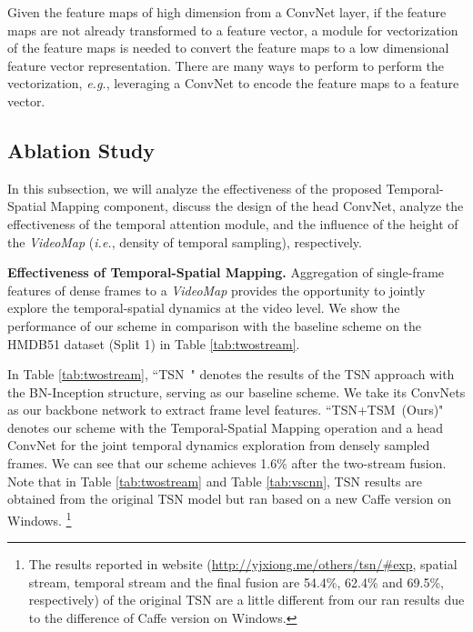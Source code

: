 \documentclass[english, 10pt, twocolumn, twoside]{IEEEtran}
\begin{document}
Given the feature maps of high dimension from a ConvNet layer, if the feature maps are not already transformed to a feature vector, a module for vectorization of the feature maps is needed to convert the feature maps to a low dimensional feature vector representation. There are many ways to perform to perform the vectorization, \emph{e.g.}, leveraging a ConvNet to encode the feature maps to a feature vector.









\subsection{Ablation Study}

In this subsection, we will analyze the effectiveness of the proposed Temporal-Spatial Mapping component, discuss the design of the head ConvNet, analyze the effectiveness of the temporal attention module, and the influence of the height of the \emph{VideoMap} (\emph{i.e.}, density of temporal sampling), respectively.


\noindent\textbf{Effectiveness of Temporal-Spatial Mapping.} Aggregation of single-frame features of dense frames to a \emph{VideoMap} provides the opportunity to jointly explore the temporal-spatial dynamics at the video level. We show the performance of our scheme in comparison with the baseline scheme on the HMDB51 dataset (Split 1) in Table \ref{tab:twostream}.

In Table \ref{tab:twostream}, ``TSN~\cite{wang2016temporal}" denotes the results of the TSN approach \cite{wang2016temporal} with the BN-Inception structure, serving as our baseline scheme. We take its ConvNets as our backbone network to extract frame level features. ``TSN+TSM~(Ours)" denotes our scheme with the Temporal-Spatial Mapping operation and a head ConvNet for the joint temporal dynamics exploration from densely sampled frames. We can see that our scheme achieves 1.6\% after the two-stream fusion. Note that in Table \ref{tab:twostream} and Table \ref{tab:vscnn}, TSN results are obtained from the original TSN model but ran based on a new Caffe version on Windows. \footnote{The results reported in website (\url{http://yjxiong.me/others/tsn/\#exp}, spatial stream, temporal stream and the final fusion are 54.4\%, 62.4\% and 69.5\%, respectively) of the original TSN are a little different from our ran results due to the difference of Caffe version on Windows. }
\end{document}
